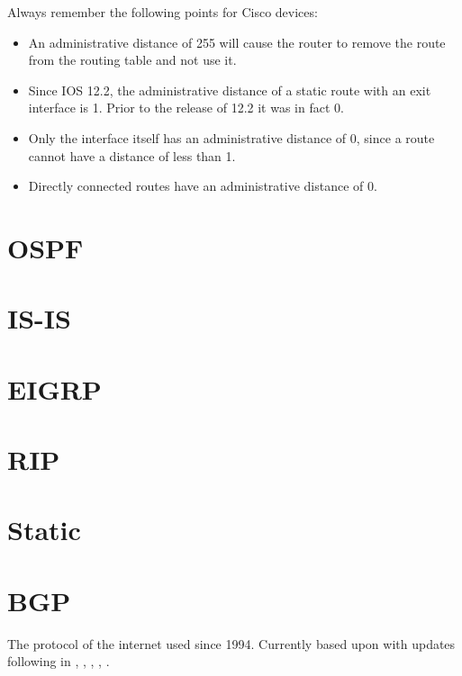 Always remember the following points for Cisco devices:\cite{wiki:Administrative_distance}
\begin{itemize}
    \item An administrative distance of 255 will cause the router to remove the route from the routing table and not use it.
    \item Since IOS 12.2, the administrative distance of a static route with an exit interface is 1. Prior to the release of 12.2 it was in fact 0.
    \item Only the interface itself has an administrative distance of 0, since a route cannot have a distance of less than 1.
    \item Directly connected routes have an administrative distance of 0.
\end{itemize}

\newpage

\section{OSPF}

\newpage

\section{IS-IS}

\newpage

\section{EIGRP}

\newpage

\section{RIP}

\newpage

\section{Static}

\newpage

\section{BGP}


The protocol of the internet used since 1994.\cite{wiki:Border_Gateway_Protocol}
Currently based upon  with updates following in  , , , , .

